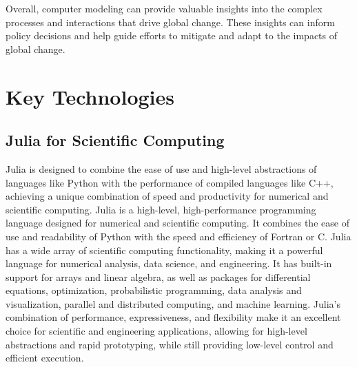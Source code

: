 Overall, computer modeling can provide valuable insights into the complex processes and interactions that drive global change. These insights can inform policy decisions and help guide efforts to mitigate and adapt to the impacts of global change.


\section{Key Technologies}


\subsection{Julia for Scientific Computing}

Julia is designed to combine the ease of use and high-level abstractions of languages like Python with the performance of compiled languages like C++, achieving a unique combination of speed and productivity for numerical and scientific computing.  Julia is a high-level, high-performance programming language designed for numerical and scientific computing. It combines the ease of use and readability of Python with the speed and efficiency of Fortran or C.   Julia has a wide array of scientific computing functionality, making it a powerful language for numerical analysis, data science, and engineering. It has built-in support for arrays and linear algebra, as well as packages for differential equations, optimization, probabilistic programming, data analysis and visualization, parallel and distributed computing, and machine learning. Julia's combination of performance, expressiveness, and flexibility make it an excellent choice for scientific and engineering applications, allowing for high-level abstractions and rapid prototyping, while still providing low-level control and efficient execution.

